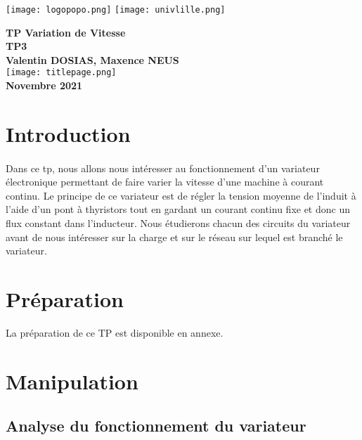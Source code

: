 \documentclass[oneside,a4paper,12pt]{article}
\begin{document}
	\begin{titlepage}
		\texttt{[image: logopopo.png]}
		\hspace*{\fill}
		\texttt{[image: univlille.png]}
		
		\begin{center}
			\vspace{1cm}
			\textbf{TP Variation de Vitesse}\\
			\textbf{TP3 }\\
			\vspace{1cm}
			\textbf{Valentin DOSIAS, Maxence NEUS}\\
			\vspace{3cm}
			\texttt{[image: titlepage.png]}\\
			\vspace{\fill}
			\textbf{Novembre 2021}\\
		\end{center}
	\end{titlepage}
	
	\tableofcontents
	\newpage
	
	\section{Introduction}
	\paragraph{}
	Dans ce tp, nous allons nous intéresser au fonctionnement d’un variateur électronique permettant de faire varier la vitesse d’une machine à courant continu. Le principe de ce variateur est de régler la tension moyenne de l’induit à l’aide d’un pont à thyristors tout en gardant un courant continu fixe et donc un flux constant dans l’inducteur. Nous étudierons chacun des circuits du variateur avant de nous intéresser sur la charge et sur le réseau sur lequel est branché le variateur.
	
	\section{Préparation}
	
		La préparation de ce TP est disponible en annexe.
		
	\section{Manipulation}
	
	\subsection{Analyse du fonctionnement du variateur}
	
\end{document}
